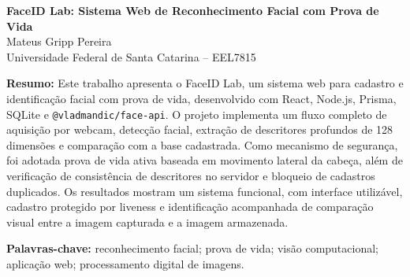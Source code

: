 \documentclass[10pt,a4paper]{article}
\begin{document}
\begin{center}
    {\large \textbf{FaceID Lab: Sistema Web de Reconhecimento Facial com Prova de Vida}}\\[0.12cm]
    Mateus Gripp Pereira\\
    Universidade Federal de Santa Catarina -- EEL7815
\end{center}

\vspace{0.08cm}

\noindent\textbf{Resumo:}
Este trabalho apresenta o FaceID Lab, um sistema web para cadastro e identifica\c{c}\~ao facial com prova de vida, desenvolvido com React, Node.js, Prisma, SQLite e \texttt{@vladmandic/face-api}. O projeto implementa um fluxo completo de aquisi\c{c}\~ao por webcam, detec\c{c}\~ao facial, extra\c{c}\~ao de descritores profundos de 128 dimens\~oes e compara\c{c}\~ao com a base cadastrada. Como mecanismo de seguran\c{c}a, foi adotada prova de vida ativa baseada em movimento lateral da cabe\c{c}a, al\'em de verifica\c{c}\~ao de consist\^encia de descritores no servidor e bloqueio de cadastros duplicados. Os resultados mostram um sistema funcional, com interface utiliz\'avel, cadastro protegido por liveness e identifica\c{c}\~ao acompanhada de compara\c{c}\~ao visual entre a imagem capturada e a imagem armazenada.

\noindent\textbf{Palavras-chave:}
reconhecimento facial; prova de vida; vis\~ao computacional; aplica\c{c}\~ao web; processamento digital de imagens.

\vspace{0.12cm}
\end{document}
